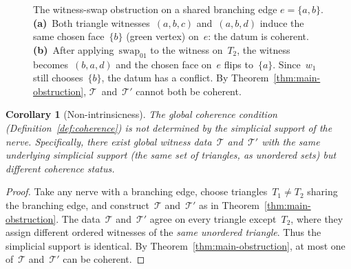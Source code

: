 \documentclass[11pt,a4paper]{article}
\theoremstyle{plain}
\newtheorem{corollary}[theorem]{Corollary}
\theoremstyle{definition}
\theoremstyle{remark}
\newcommand{\cT}{\mathcal{T}}
\newcommand{\swapAB}{\mathrm{swap}_{01}}
\begin{document}
\begin{figure}[t]
\caption{The witness-swap obstruction on a shared branching edge
$e = \{a,b\}$. \textbf{(a)}~Both triangle witnesses~$(a,b,c)$
and~$(a,b,d)$ induce the same chosen face~$\{b\}$ (green vertex) on~$e$:
the datum is coherent. \textbf{(b)}~After applying~$\swapAB$ to the
witness on~$T_2$, the witness becomes~$(b,a,d)$ and the chosen face
on~$e$ flips to~$\{a\}$. Since~$w_1$ still chooses~$\{b\}$, the
datum has a conflict. By Theorem~\ref{thm:main-obstruction},
$\cT$~and~$\cT'$ cannot both be coherent.}
\label{fig:obstruction}
\end{figure}

\begin{corollary}[Non-intrinsicness]
\label{cor:non-intrinsic}
The global coherence condition (Definition~\ref{def:coherence}) is not
determined by the simplicial support of the nerve. Specifically, there
exist global witness data~$\cT$ and~$\cT'$ with the same underlying
simplicial support (the same set of triangles, as unordered sets) but
different coherence status.
\end{corollary}

\begin{proof}
Take any nerve with a branching edge, choose triangles~$T_1 \neq T_2$
sharing the branching edge, and construct~$\cT$ and~$\cT'$ as in
Theorem~\ref{thm:main-obstruction}. The data~$\cT$ and~$\cT'$ agree
on every triangle except~$T_2$, where they assign different ordered
witnesses of the \emph{same unordered triangle}. Thus the simplicial
support is identical. By Theorem~\ref{thm:main-obstruction},
at most one of~$\cT$ and~$\cT'$ can be coherent.
\end{proof}
\end{document}
